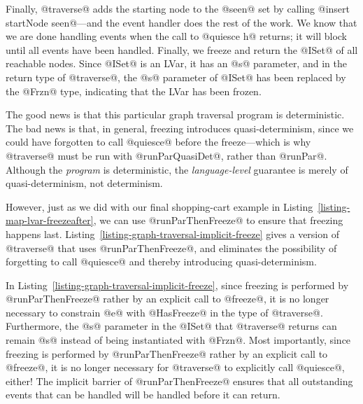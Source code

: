 Finally, @traverse@ adds the starting node to the @seen@ set by
calling @insert startNode seen@---and the event handler does the rest
of the work.  We know that we are done handling events when the call
to @quiesce h@ returns; it will block until all events have been
handled.  Finally, we freeze and return the @ISet@ of all reachable
nodes.  Since @ISet@ is an LVar, it has an @s@ parameter, and in the
return type of @traverse@, the @s@ parameter of @ISet@ has been
replaced by the @Frzn@ type, indicating that the LVar has been frozen.

The good news is that this particular graph traversal program is
deterministic.  The bad news is that, in general, freezing introduces
quasi-determinism, since we could have forgotten to call @quiesce@
before the freeze---which is why @traverse@ must be run with
@runParQuasiDet@, rather than @runPar@.  Although the \emph{program}
is deterministic, the \emph{language-level} guarantee is merely of
quasi-determinism, not determinism.

However, just as we did with our final shopping-cart example in
Listing~\ref{listing-map-lvar-freezeafter}, we can use
@runParThenFreeze@ to ensure that freezing happens last.
Listing~\ref{listing-graph-traversal-implicit-freeze} gives a version
of @traverse@ that uses @runParThenFreeze@, and eliminates the
possibility of forgetting to call @quiesce@ and thereby introducing
quasi-determinism.

\singlespacing

\doublespacing

In Listing~\ref{listing-graph-traversal-implicit-freeze}, since
freezing is performed by @runParThenFreeze@ rather by an explicit call
to @freeze@, it is no longer necessary to constrain @e@ with
@HasFreeze@ in the type of @traverse@.  Furthermore, the @s@ parameter
in the @ISet@ that @traverse@ returns can remain @s@ instead of being
instantiated with @Frzn@.  Most importantly, since freezing is
performed by @runParThenFreeze@ rather by an explicit call to
@freeze@, it is no longer necessary for @traverse@ to explicitly call
@quiesce@, either!  The implicit barrier of @runParThenFreeze@ ensures
that all outstanding events that can be handled will be handled before
it can return.
